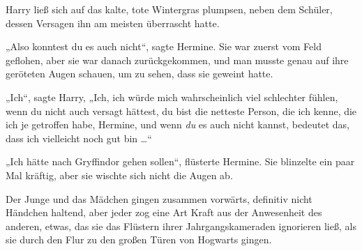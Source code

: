 Harry ließ sich auf das kalte, tote Wintergras plumpsen, neben dem Schüler, dessen Versagen ihn am meisten überrascht hatte.

„Also konntest du es auch nicht“, sagte Hermine. Sie war zuerst vom Feld geflohen, aber sie war danach zurückgekommen, und man musste genau auf ihre geröteten Augen schauen, um zu sehen, dass sie geweint hatte.

„Ich“, sagte Harry,
„Ich, ich würde mich wahrscheinlich viel schlechter fühlen, wenn du nicht auch versagt hättest, du bist die netteste Person, die ich kenne, die ich je getroffen habe, Hermine, und wenn \emph{du} es auch nicht kannst, bedeutet das, dass ich vielleicht noch gut bin …“

„Ich hätte nach Gryffindor gehen sollen“, flüsterte Hermine. Sie blinzelte ein paar Mal kräftig, aber sie wischte sich nicht die Augen ab.

\later

Der Junge und das Mädchen gingen zusammen vorwärts, definitiv nicht Händchen haltend, aber jeder zog eine Art Kraft aus der Anwesenheit des anderen, etwas, das sie das Flüstern ihrer Jahrgangskameraden ignorieren ließ, als sie durch den Flur zu den großen Türen von Hogwarts gingen.

